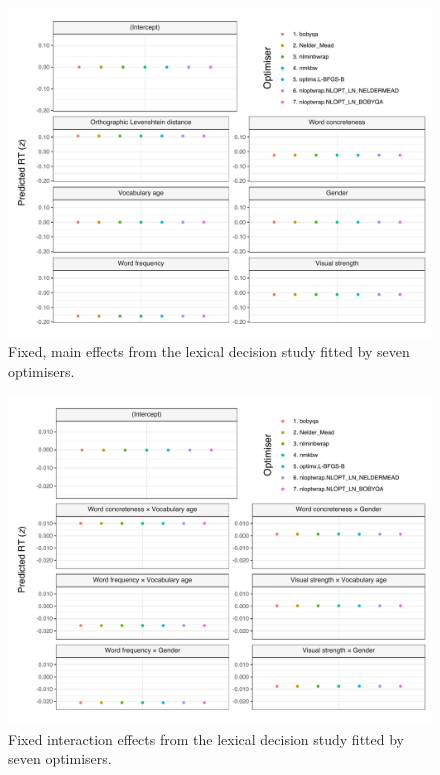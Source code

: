 \documentclass[
  12pt,
  man,floatsintext]{apa7}
\begin{document}
\begin{figure}

{\centering \includegraphics[width=1\linewidth]{../lexicaldecision/frequentist_analysis/model_diagnostics/plots/main_effects_lexicaldecision_allFit_convergence} 

}

\caption{Fixed, main effects from the lexical decision study fitted by seven optimisers.}\label{fig:main-effects-lexicaldecision-allFit-convergence}
\end{figure}

\begin{figure}

{\centering \includegraphics[width=1\linewidth]{../lexicaldecision/frequentist_analysis/model_diagnostics/plots/interactions_lexicaldecision_allFit_convergence} 

}

\caption{Fixed interaction effects from the lexical decision study fitted by seven optimisers.}\label{fig:interactions-lexicaldecision-allFit-convergence}
\end{figure}
\end{document}
